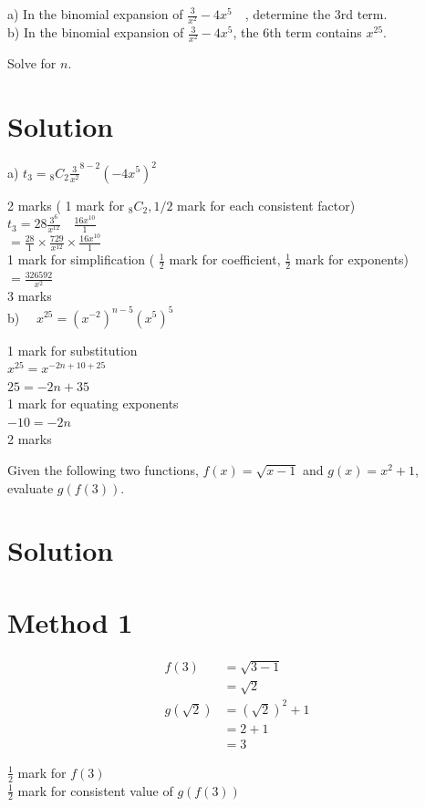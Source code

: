 \documentclass[10pt]{article}
\begin{document}
a) In the binomial expansion of $\frac{3}{x^{2}}-4 x^{5} \quad$, determine the 3rd term.\\
b) In the binomial expansion of $\frac{3}{x^{2}}-4 x^{5}$, the 6th term contains $x^{25}$.

Solve for $n$.

\section*{Solution}
a) $t_{3}={ }_{8} C_{2}{\frac{3}{x^{2}}}^{8-2}\left(-4 x^{5}\right)^{2}$

2 marks ( 1 mark for ${ }_{8} C_{2}, 1 / 2$ mark for each consistent factor)\\
$t_{3}=28 \frac{3^{6}}{x^{12}} \quad \frac{16 x^{10}}{1}$\\
$=\frac{28}{1} \times \frac{729}{x^{12}} \times \frac{16 x^{10}}{1}$\\
1 mark for simplification ( $\frac{1}{2}$ mark for coefficient, $\frac{1}{2}$ mark for exponents)\\
$=\frac{326592}{x^{2}}$\\
3 marks\\
b) $\quad x^{25}=\left(x^{-2}\right)^{n-5}\left(x^{5}\right)^{5}$

1 mark for substitution\\
$x^{25}=x^{-2 n+10+25}$\\
$25=-2 n+35$\\
1 mark for equating exponents\\
$-10=-2 n$\\
2 marks

Given the following two functions, $f(x)=\sqrt{x-1}$ and $g(x)=x^{2}+1$, evaluate $g(f(3))$.

\section*{Solution}
\section*{Method 1}
$$
\begin{aligned}
f(3) & =\sqrt{3-1} \\
& =\sqrt{2} \\
g(\sqrt{2}) & =(\sqrt{2})^{2}+1 \\
& =2+1 \\
& =3
\end{aligned}
$$

$\frac{1}{2}$ mark for $f(3)$\\
$\frac{1}{2}$ mark for consistent value of $g(f(3))$
\end{document}
